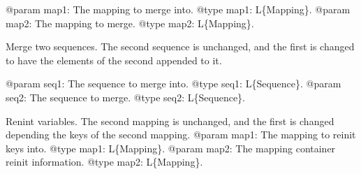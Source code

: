 \documentclass[a4paper,10pt,english]{sphinxmanual}
\begin{document}
\begin{fulllineitems}
\begin{fulllineitems}
@param map1: The mapping to merge into.
@type map1: L\{Mapping\}.
@param map2: The mapping to merge.
@type map2: L\{Mapping\}.

\end{fulllineitems}


\begin{fulllineitems}
\label{commands/apidoc/src:src.pyconf.ConfigMerger.mergeSequence}
Merge two sequences. The second sequence is unchanged,
and the first is changed to have the elements of the second
appended to it.

@param seq1: The sequence to merge into.
@type seq1: L\{Sequence\}.
@param seq2: The sequence to merge.
@type seq2: L\{Sequence\}.

\end{fulllineitems}


\begin{fulllineitems}
\label{commands/apidoc/src:src.pyconf.ConfigMerger.overwriteKeys}
Renint variables. The second mapping is unchanged,
and the first is changed depending the keys of the second mapping.
@param map1: The mapping to reinit keys into.
@type map1: L\{Mapping\}.
@param map2: The mapping container reinit information.
@type map2: L\{Mapping\}.

\end{fulllineitems}


\end{fulllineitems}

\end{document}
